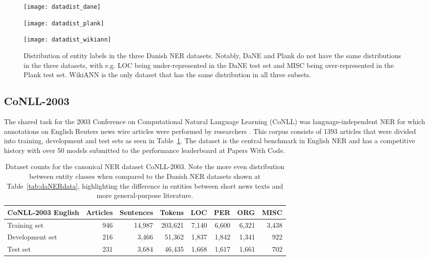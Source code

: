 \documentclass[main.tex]{subfiles}
\begin{document}
\begin{figure}[H]
    \centering
   	\begin{minipage}[t]{0.32\textwidth}
       \texttt{[image: datadist\_dane]}
    \end{minipage}\hfill
    \begin{minipage}[t]{0.32\textwidth}
        \texttt{[image: datadist\_plank]}
    \end{minipage}\hfill
    \begin{minipage}[t]{0.32\textwidth}
        \texttt{[image: datadist\_wikiann]}
    \end{minipage}
    \caption{
        Distribution of entity labels in the three Danish NER datasets.
        Notably, DaNE and Plank do not have the same distributions in the three datasets, with e.g. LOC being under-represented in the DaNE test set and MISC being over-represented in the Plank test set.
        WikiANN is the only dataset that has the same distribution in all three subsets.
    }
    \label{fig:dadatadist}
\end{figure}\noindent

\subsection{CoNLL-2003}
The shared task for the 2003 Conference on Computational Natural Language Learning (CoNLL) was language-independent NER for which annotations on English Reuters news wire articles were performed by researchers \cite{tjang2003conll}.
This corpus consists of 1393 articles that were divided into training, development and test sets as seen in Table~\ref{tab:conll2003}.
The dataset is the central benchmark in English NER \cite[Sec. 4.3]{yamada2020luke} and has a competitive history with over 50 models submitted to the performance leaderboard at Papers With Code\footnotemark.
\begin{table}[H]
    \centering
    \begin{tabular}{l|rrr|rrrr}
    CoNLL-2003 English  & Articles  & Sentences  & Tokens   & LOC   & PER   & ORG   & MISC  \\ \hline
    Training set        & 946       & 14,987     & 203,621  & 7,140  & 6,600  & 6,321  & 3,438   \\
    Development set     & 216       & 3,466      & 51,362   & 1,837  & 1,842  & 1,341  & 922    \\
    Test set            & 231       & 3,684      & 46,435   & 1,668  & 1,617  & 1,661  & 702    \\
    \end{tabular}
    \caption{
        Dataset counts for the canonical NER dataset CoNLL-2003.
        Note the more even distribution between entity classes when compared to the Danish NER datasets shown at Table~\ref{tab:daNERdata}, highlighting the difference in entities between short news texts and more general-purpose literature.
    }
    \label{tab:conll2003}
\end{table}
\end{document}
